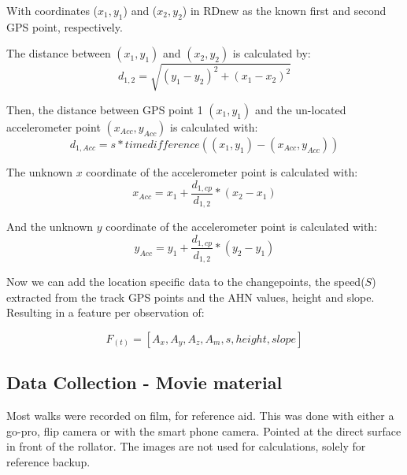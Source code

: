 With coordinates ($x_{1}, y_{1}$) and ($x_{2}, y_{2}$) in RDnew as the known first and second GPS point, respectively. 

The distance between $(x_{1}, y_{1})$ and $(x_{2}, y_{2})$ is calculated by:
\begin{equation}
d_{1,2} = \sqrt {(y_{1}-y_{2})^2 + (x_{1}-x_{2})^2 }
\end{equation}

Then, the distance between GPS point 1 $(x_{1}, y_{1})$ and the un-located accelerometer point $(x_{Acc}, y_{Acc})$ is calculated with:
\begin{equation}
d_{1,Acc} = s * time difference((x_{1}, y_{1}) - (x_{Acc}, y_{Acc}))
\end{equation}

The unknown $x$ coordinate of the accelerometer point is calculated with:
\begin{equation}
x_{Acc} = x_{1} + \frac{d_{1,cp}}{d_{1,2}} * (x_{2} - x_{1})
\end{equation}

And the unknown $y$ coordinate of the accelerometer point is calculated with:
\begin{equation}
y_{Acc} = y_{1} + \frac{d_{1,cp}}{d_{1,2}} * (y_{2} - y_{1})
\end{equation}

Now we can add the location specific data to the changepoints, the speed($S$) extracted from the track GPS points and the AHN values, height and slope. Resulting in a feature per observation of:

\begin{equation} 
	F_{(t)} = [A_{x}, A_{y}, A_{z}, A_{m}, s, height, slope] 
\end{equation}

\subsection{Data Collection - Movie material}
Most walks were recorded on film, for reference aid. This was done with either a go-pro, flip camera or with the smart phone camera. Pointed at the direct surface in front of the rollator. The images are not used for calculations, solely for reference backup. 

